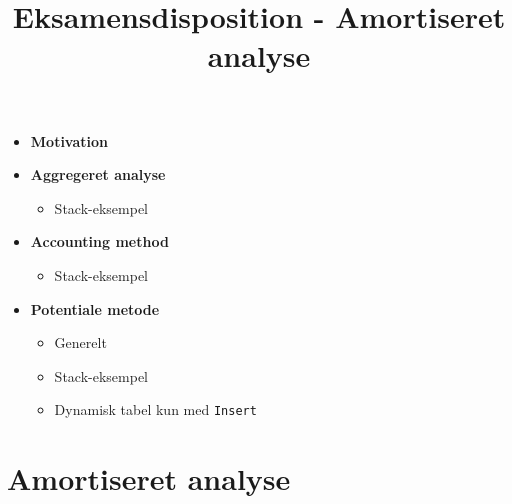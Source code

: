 
\title{Eksamensdisposition - Amortiseret analyse}

\maketitle



\begin{itemize}
\item \textbf{Motivation}

\item \textbf{Aggregeret analyse}
\begin{itemize}
	\item Stack-eksempel
\end{itemize}

\item \textbf{Accounting method}
\begin{itemize}
	\item Stack-eksempel
\end{itemize}


\item \textbf{Potentiale metode}
\begin{itemize}
	\item Generelt
	\item Stack-eksempel
	\item Dynamisk tabel kun med \texttt{Insert}
\end{itemize}


\end{itemize}

\newpage
\section{Amortiseret analyse}



